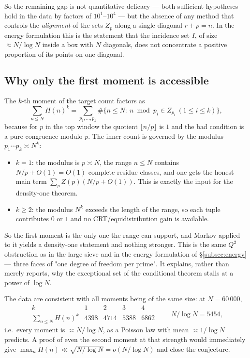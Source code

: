 So the remaining gap is not quantitative delicacy — both sufficient hypotheses hold in the
data by factors of $10^1$--$10^4$ — but the absence of any method that controls the
\emph{alignment} of the sets $Z_p$ along a single diagonal $r+p=n$.  In the energy formulation
this is the statement that the incidence set $I$, of size $\approx N/\log N$ inside a box with
$N$ diagonals, does not concentrate a positive proportion of its points on one diagonal.

\subsection{Why only the first moment is accessible}
\label{subsec:firstmoment}

The $k$-th moment of the target count factors as
\[
  \sum_{n\le N}H(n)^k
  =\sum_{p_1,\dots,p_k}\#\bigl\{n\le N:\ n\bmod p_i\in Z_{p_i}\ (1\le i\le k)\bigr\},
\]
because for $p$ in the top window the quotient $\lfloor n/p\rfloor$ is $1$ and the bad
condition is a pure congruence modulo $p$.  The inner count is governed by the modulus
$p_1\cdots p_k\asymp N^k$:

\begin{itemize}
\item $k=1$: the modulus is $p\asymp N$, the range $n\le N$ contains $N/p+O(1)=O(1)$ complete
residue classes, and one gets the honest main term $\sum_p Z(p)(N/p+O(1))$.  This is exactly
the input for the density-one theorem.
\item $k\ge2$: the modulus $N^k$ exceeds the length of the range, so each tuple contributes
$0$ or $1$ and no CRT/equidistribution gain is available.
\end{itemize}

So the first moment is the only one the range can support, and Markov applied to it yields a
density-one statement and nothing stronger.  This is the same $Q^2$ obstruction as in the large
sieve and in the energy formulation of \S\ref{subsec:energy} — three faces of "one degree of
freedom per prime".  It explains, rather than merely reports, why the exceptional set of the
conditional theorem stalls at a power of $\log N$.

The data are consistent with all moments being of the same size: at $N=60\,000$,
\[
\begin{array}{c|cccc}
 k&1&2&3&4\\ \hline
 \sum_{n\le N}H(n)^k&4398&4714&5388&6862
\end{array}
\qquad N/\log N=5454,
\]
i.e.\ every moment is $\asymp N/\log N$, as a Poisson law with mean $\asymp1/\log N$ predicts.
A proof of even the second moment at that strength would immediately give
$\max_nH(n)\ll\sqrt{N/\log N}=o(N/\log N)$ and close the conjecture.


